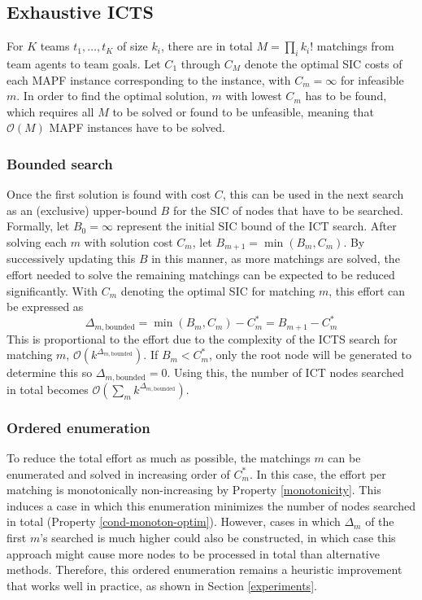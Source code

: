 \documentclass[english,10pt]{article}
\begin{document}
	\subsection{Exhaustive ICTS}
	\label{exhaustive}
	For $K$ teams $t_1,\ldots,t_K$ of size $k_i$, there are in total $M = \prod_{i} k_i!$ matchings from team agents to team goals. Let $C_1$ through $C_M$ denote the optimal SIC costs of each MAPF instance corresponding to the instance, with $C_m = \infty$ for infeasible $m$. In order to find the optimal solution, $m$ with lowest $C_m$ has to be found, which requires all $M$ to be solved or found to be unfeasible, meaning that $\mathcal{O}(M)$ MAPF instances have to be solved. 
	\subsubsection{Bounded search}
	Once the first solution is found with cost $C$, this can be used in the next search as an (exclusive) upper-bound $B$ for the SIC of nodes that have to be searched. Formally, let $B_0 = \infty$ represent the initial SIC bound of the ICT search. After solving each $m$ with solution cost $C_m$, let $B_{m+1} = \min(B_m,C_m)$. By successively updating this $B$ in this manner, as more matchings are solved, the effort needed to solve the remaining matchings can be expected to be reduced significantly. With $C_m$ denoting the optimal SIC for matching $m$, this effort can be expressed as	
	\[\Delta_{m,\text{bounded}} = \min(B_m,C_m) - C^*_m = B_{m+1} - C^*_m\]
	This is proportional to the effort due to the complexity of the ICTS search for matching $m$, $\mathcal{O}(k^{\Delta_{m,\text{bounded}}})$.
	If $B_m < C^*_m$, only the root node will be generated to determine this so $\Delta_{m,\text{bounded}} = 0$.
	Using this, the number of ICT nodes searched in total becomes $\mathcal{O}(\sum_m k^{\Delta_{m,\text{bounded}}})$.
	\subsubsection{Ordered enumeration}
	\label{ordered-enum}
	To reduce the total effort as much as possible, the matchings $m$ can be enumerated and solved in increasing order of $C^*_m$. In this case, the effort per matching is monotonically non-increasing by Property \ref{monotonicity}. This induces a case in which this enumeration minimizes the number of nodes searched in total (Property \ref{cond-monoton-optim}). However, cases in which $\Delta_m$ of the first $m$'s searched is much higher could also be constructed, in which case this approach might cause more nodes to be processed in total than alternative methods. Therefore, this ordered enumeration remains a heuristic improvement that works well in practice, as shown in Section \ref{experiments}.
	
\end{document}
